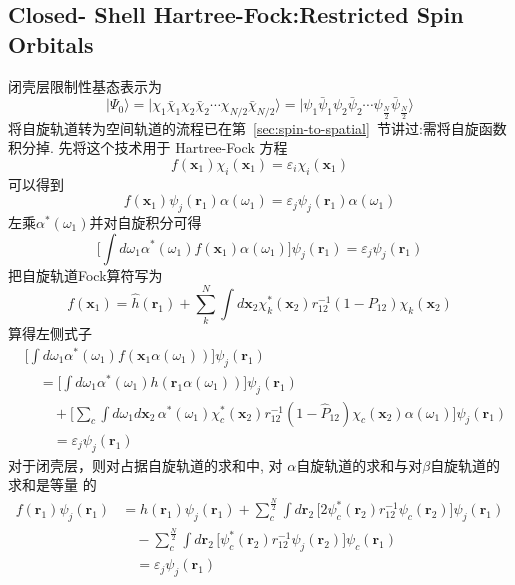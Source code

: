 \documentclass[fontset=none,12pt,a4paper]{ctexart}
\numberwithin{equation}{section}
\begin{document}
\subsection{Closed- Shell Hartree-Fock:Restricted Spin Orbitals}
闭壳层限制性基态表示为
\begin{equation}
  |\Psi_0\rangle=|\chi_1\bar{\chi}_1\chi_2\bar{\chi}_2\cdots\chi_{N/2}\bar{\chi}_{N/2}\rangle=|\psi_1\bar{\psi}_1\psi_2\bar{\psi}_2\cdots\psi_{\frac{N}{2}}\bar{\psi}_{\frac{N}{2}}\rangle
\end{equation}
将自旋轨道转为空间轨道的流程已在第~\ref{sec:spin-to-spatial}~节讲过:需将自旋函数积分掉. 先将这个技术用于
Hartree-Fock 方程
\begin{equation}
  f(\mathbf{x}_1)\chi_i(\mathbf{x}_1)=\varepsilon_i\chi_i(\mathbf{x}_1)
\end{equation}
可以得到
\begin{equation}
  f(\mathbf{x}_1)\psi_j(\mathbf{r}_1)\alpha(\omega_1)=\varepsilon_j\psi_j(\mathbf{r}_1)\alpha(\omega_1)
\end{equation}
左乘$\alpha^*(\omega_1)$并对自旋积分可得
\begin{equation}
  \big[\int d\omega_1\alpha^*(\omega_1)f(\mathbf{x}_1)\alpha(\omega_1)\big]\psi_j(\mathbf{r}_1)=\varepsilon_j\psi_j(\mathbf{r}_1)
\end{equation}
把自旋轨道Fock算符写为
\begin{equation}
  f(\mathbf{x}_1)=\hat{h}(\mathbf{r}_1)+\sum_k^{N}\int d\mathbf{x}_2\chi_k^*(\mathbf{x}_2)r_{12}^{-1}(1-P_{12})\chi_k(\mathbf{x}_2)
\end{equation}
算得左侧式子
\begin{equation}
  \begin{aligned}
  &\big[\int d\omega_1\alpha^*(\omega_1)f(\mathbf{x}_1\alpha(\omega_1))\big]\psi_j(\mathbf{r}_1) \\
  &\quad = \big[\int d\omega_1\alpha^*(\omega_1)h(\mathbf{r}_1\alpha(\omega_1))\big]\psi_j(\mathbf{r}_1) \\
  &\qquad +\Big[\sum_{c}\int d\omega_1d\mathbf{x}_2\,
     \alpha^*(\omega_1)\chi_c^*(\mathbf{x}_2)r_{12}^{-1}(1-\hat{P}_{12})
     \chi_c(\mathbf{x}_2)\alpha(\omega_1)\Big]\psi_j(\mathbf{r}_1) \\
  &\qquad = \varepsilon_j\psi_j(\mathbf{r}_1)
  \end{aligned}
\end{equation}
对于闭壳层，则对占据自旋轨道的求和中, 对
$\alpha$自旋轨道的求和与对$\beta$自旋轨道的求和是等量 的
\begin{equation}
  \begin{aligned}
  f(\mathbf{r}_1)\psi_j(\mathbf{r}_1)
  &= h(\mathbf{r}_1)\psi_j(\mathbf{r}_1)
     +\sum_{c}^{\frac{N}{2}}\int d\mathbf{r}_2\,
     \bigl[2\psi_c^*(\mathbf{r}_2)r_{12}^{-1}\psi_c(\mathbf{r}_2)\bigr]\psi_j(\mathbf{r}_1) \\
  &\quad -\sum_{c}^{\frac{N}{2}}\int d\mathbf{r}_2\,
     \bigl[\psi_c^*(\mathbf{r}_2)r_{12}^{-1}\psi_j(\mathbf{r}_2)\bigr]\psi_c(\mathbf{r}_1) \\
  &\quad = \varepsilon_j\psi_j(\mathbf{r}_1)
  \end{aligned}
\end{equation}
\end{document}
